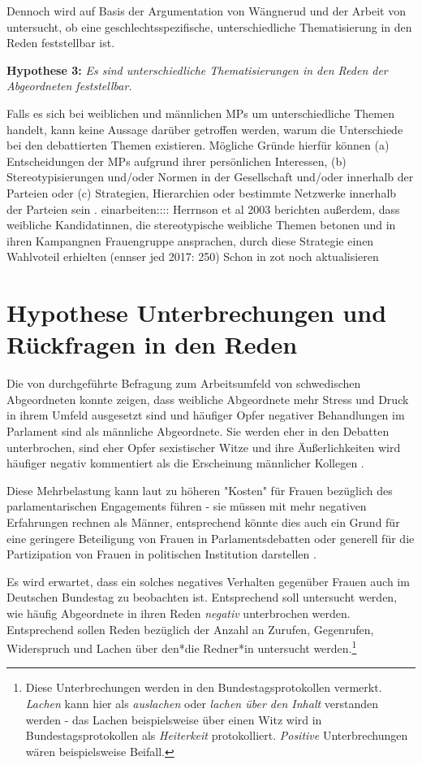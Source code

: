 \documentclass[12pt, 
    twoside=false, 
    bibliography=totoc, 
    numbers=endperiod, 
    headings=normal, 
    toc=chapterentrydotfill
    ]{scrbook}
\begin{document}
Dennoch wird auf Basis der Argumentation von Wängnerud \parencites*{wangnerud_2000}{wangnerud_2009} und der Arbeit von \textcite{back_2014} untersucht, ob eine geschlechtsspezifische, unterschiedliche Thematisierung in den Reden feststellbar ist. 

\textbf{Hypothese 3:} \emph{Es sind unterschiedliche Thematisierungen in den Reden der Abgeordneten feststellbar.}


Falls es sich bei weiblichen und männlichen MPs um unterschiedliche Themen handelt, kann keine Aussage darüber getroffen werden, warum die Unterschiede bei den debattierten Themen existieren. Mögliche Gründe hierfür können (a) Entscheidungen der MPs aufgrund ihrer persönlichen Interessen, (b) Stereotypisierungen und/oder Normen in der Gesellschaft und/oder innerhalb der Parteien oder (c) Strategien, Hierarchien oder bestimmte Netzwerke innerhalb der Parteien sein  \parencites[507]{back_2014}.
einarbeiten:::: Herrnson et al 2003 berichten außerdem, dass weibliche Kandidatinnen, die stereotypische weibliche Themen betonen und in ihren Kampangnen Frauengruppe ansprachen, durch diese Strategie einen Wahlvoteil erhielten (ennser jed 2017: 250) Schon in zot noch aktualisieren  

\section{Hypothese Unterbrechungen und Rückfragen in den Reden}


Die von \textcite{erikson_2018} durchgeführte Befragung zum Arbeitsumfeld von schwedischen Abgeordneten konnte zeigen, dass weibliche Abgeordnete mehr Stress und Druck in ihrem Umfeld ausgesetzt sind und häufiger Opfer negativer Behandlungen im Parlament sind als männliche Abgeordnete. Sie werden eher in den Debatten unterbrochen, sind eher Opfer sexistischer Witze und ihre Äußerlichkeiten wird häufiger negativ kommentiert als die Erscheinung männlicher Kollegen \parencite[13]{erikson_2018}.


Diese Mehrbelastung kann laut \textcite{erikson_2018} zu höheren "Kosten" für Frauen bezüglich des parlamentarischen Engagements führen - sie müssen mit mehr negativen Erfahrungen rechnen als Männer, entsprechend könnte dies auch ein Grund für eine geringere Beteiligung von Frauen in Parlamentsdebatten oder generell für die Partizipation von Frauen in politischen Institution darstellen \parencites[vgl.][]{erikson_2018}[vgl.][]{back_2014}.

Es wird erwartet, dass ein solches negatives Verhalten gegenüber Frauen auch im Deutschen Bundestag zu beobachten ist. Entsprechend soll untersucht werden, wie häufig Abgeordnete in ihren Reden \emph{negativ} unterbrochen werden. Entsprechend sollen Reden bezüglich der Anzahl an Zurufen, Gegenrufen, Widerspruch und Lachen über den*die Redner*in untersucht werden.\footnote{Diese Unterbrechungen werden in den Bundestagsprotokollen vermerkt. \emph{Lachen} kann hier als \emph{auslachen} oder \emph{lachen über den Inhalt} verstanden werden - das Lachen beispielsweise über einen Witz wird in Bundestagsprotokollen als \emph{Heiterkeit} protokolliert. \emph{Positive} Unterbrechungen wären beispielsweise Beifall.}
\end{document}
